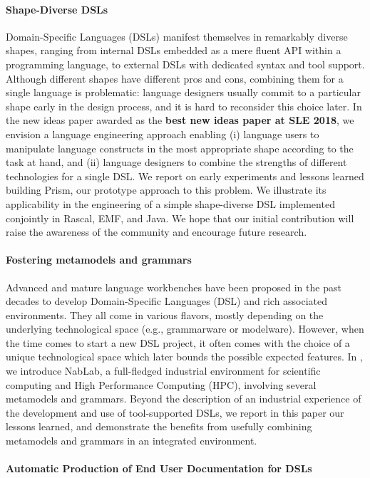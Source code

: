 \paragraph{Shape-Diverse DSLs}
Domain-Specific Languages (DSLs) manifest themselves in remarkably diverse shapes, ranging from internal DSLs embedded as a mere fluent API within a programming language, to external DSLs with dedicated syntax and tool support. Although different shapes have different pros and cons, combining them for a single language is problematic: language designers usually commit to a particular shape early in the design process, and it is hard to reconsider this choice later. In the new ideas paper \cite{coulon:hal-01889155} awarded as the \textbf{best new ideas paper at SLE 2018}, we envision a language engineering approach enabling (i) language users to manipulate language constructs in the most appropriate shape according to the task at hand, and (ii) language designers to combine the strengths of different technologies for a single DSL. We report on early experiments and lessons learned building Prism, our prototype approach to this problem. We illustrate its applicability in the engineering of a simple shape-diverse DSL implemented conjointly in Rascal, EMF, and Java. We hope that our initial contribution will raise the awareness of the community and encourage future research.

\paragraph{Fostering metamodels and grammars}
Advanced and mature language workbenches have been proposed in the past decades to develop Domain-Specific Languages (DSL) and rich associated environments. They all come in various flavors, mostly depending on the underlying technological space (e.g., grammarware or modelware). However, when the time comes to start a new DSL project, it often comes with the choice of a unique technological space which later bounds the possible expected features. In \cite{lelandais:hal-01910139}, we introduce NabLab, a full-fledged industrial environment for scientific computing and High Performance Computing (HPC), involving several metamodels and grammars. Beyond the description of an industrial experience of the development and use of tool-supported DSLs, we report in this paper our lessons learned, and demonstrate the benefits from usefully combining metamodels and grammars in an integrated environment.


\paragraph{Automatic Production of End User Documentation for DSLs}

